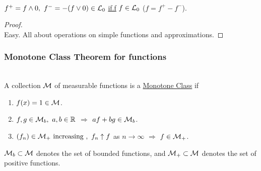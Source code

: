 \begin{corollary}\ \\
$f^+ = f \wedge 0,\ f^- = - (f \vee 0) \in \mathcal{L}_0$ \underline{if.f} $f \in \mathcal{L}_0$ ($f = f^+ - f^-$).
\end{corollary}
\begin{proof}\ \\
Easy. All about operations on simple functions and approximations.
\end{proof}

\vspace{4pt}
\subsubsection{Monotone Class Theorem for functions}
\begin{definition}\label{1.16}\ \\
A collection $\mathcal{M}$ of measurable functions is a \underline{Monotone Class} if
\begin{enumerate}[label = (\arabic*)]
    \item $f(x) = 1 \in \mathcal{M}$.
    \item $f,g \in \mathcal{M}_b,\ a,b \in \mathbb{R}$ $\Rightarrow$ $af + bg \in \mathcal{M}_b$.
    \item $(f_n) \in \Ms_+ \text{ increasing },\ f_n \uparrow f$ as $n \to \infty$ $\Rightarrow$ $f \in \mathcal{M}_+$. 
\end{enumerate}
\end{definition}
\begin{remark}
$\mathcal{M}_b \subset \mathcal{M}$ denotes the set of bounded functions, and $\mathcal{M}_+ \subset \mathcal{M}$ denotes the set of positive functions.   
\end{remark}

